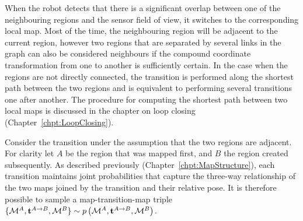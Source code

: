 When the robot detects that there is a significant overlap between one
of the neighbouring regions and the sensor field of view, it switches
to the corresponding local map. Most of the time, the neighbouring
region will be adjacent to the current region, however two regions
that are separated by several links in the graph can also be
considered neighbours if the compound coordinate transformation from
one to another is sufficiently certain.  In the case when the regions
are not directly connected, the transition is performed along the
shortest path between the two regions and is equivalent to performing
several transitions one after another. The procedure for computing the
shortest path between two local maps is discussed in the chapter on
loop closing (Chapter~\ref{chpt:LoopClosing}).

Consider the transition under the assumption that the two regions are
adjacent. For clarity let $A$ be the region that was mapped first, and
$B$ the region created subsequently. As described previously
(Chapter~\ref{chpt:MapStructure}), each transition maintains joint
probabilities that capture the three-way relationship of the two maps
joined by the transition and their relative pose. It is therefore
possible to sample a map-transition-map triple $\{
{\mapA,\tr{}{A}{B},\mapB} \} \sim \prob{\mapA,\tr{}{A}{B},\mapB} $.
 

